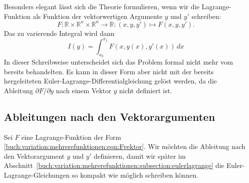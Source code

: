 Besonders elegant lässt sich die Theorie formulieren, wenn wir
die Lagrange-Funktion als Funktion der vektorwertigen Argumente
$y$ und $y'$ schreiben:
\begin{equation}
F
\colon
\mathbb{R}\times\mathbb{R}^n\times\mathbb{R}^n
\to
\mathbb{R}
:
(x,y,y')
\mapsto F(x,y,y').
\label{buch:variation:mehrerefunktionen:eqn:Fvektor}
\end{equation}
Das zu varierende Integral wird dann
\[
I(y)
=
\int_{x_0}^{x_1}
F(x,y(x),y'(x))
\,dx
\]
In dieser Schreibweise unterscheidet sich das Problem formal
nicht mehr vom bereits behandelten.
Es kann in dieser Form aber nicht mit der bereits hergeleiteten
Euler-Lagrange-Differentialgleichung gelöst werden, da die
Ableitung $\partial F/\partial y$ nach einem Vektor $y$ nicht
definiert ist.

%
%
\subsection{Ableitungen nach den Vektorargumenten
\label{buch:variation:mehrerefunktionen:subsection:vektorableitung}}
Sei $F$ eine Lagrange-Funktion der Form
\eqref{buch:variation:mehrerefunktionen:eqn:Fvektor}.
Wir möchten die Ableitung nach den Vektorargument $y$ und $y'$ 
definieren, damit wir später im
Abschnitt~\ref{buch:variation:mehrerefunktionen:subsection:eulerlagrange}
die Euler-Lagrange-Gleichungen so kompakt wie möglich schreiben können.

